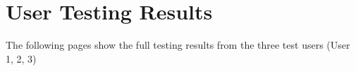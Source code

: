 \chapter{User Testing Results}
The following pages show the full testing results from the three test users (User 1, 2, 3)


